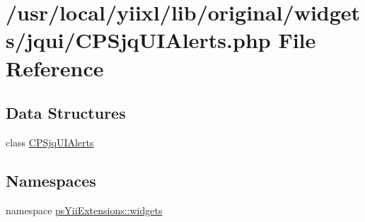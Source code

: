 \hypertarget{CPSjqUIAlerts_8php}{
\section{/usr/local/yiixl/lib/original/widgets/jqui/CPSjqUIAlerts.php File Reference}
\label{CPSjqUIAlerts_8php}
}
\subsection*{Data Structures}
\begin{DoxyCompactItemize}
\item 
class \hyperlink{classCPSjqUIAlerts}{CPSjqUIAlerts}
\end{DoxyCompactItemize}
\subsection*{Namespaces}
\begin{DoxyCompactItemize}
\item 
namespace \hyperlink{namespacepsYiiExtensions_1_1widgets}{psYiiExtensions::widgets}
\end{DoxyCompactItemize}
